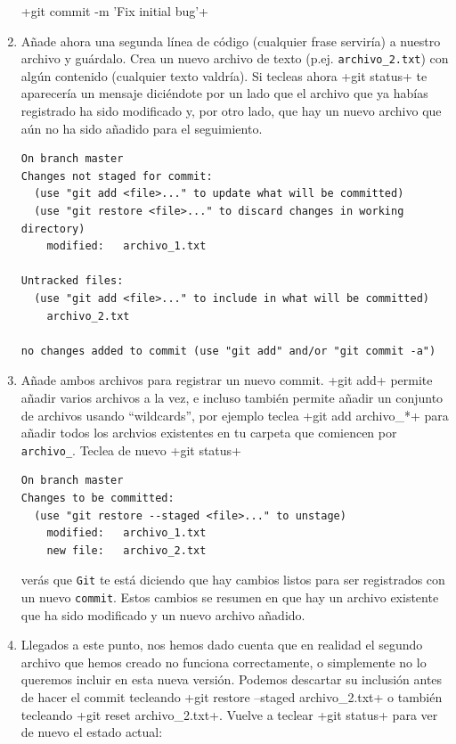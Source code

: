 \documentclass[a5paper,10pt]{article}
\begin{document}
\begin{enumerate}
    \cverb+git commit -m 'Fix initial bug'+
    
    \item Añade ahora una segunda línea de código (cualquier frase serviría) a nuestro archivo y guárdalo. Crea un nuevo archivo de texto (p.ej. \verb+archivo_2.txt+) con algún contenido (cualquier texto valdría). Si tecleas ahora \cverb+git status+ te aparecería un mensaje diciéndote por un lado que el archivo que ya habías registrado ha sido modificado y, por otro lado, que hay un nuevo archivo que aún no ha sido añadido para el seguimiento.
    
    \begin{lstlisting}[style=custom]
On branch master
Changes not staged for commit:
  (use "git add <file>..." to update what will be committed)
  (use "git restore <file>..." to discard changes in working directory)
	modified:   archivo_1.txt

Untracked files:
  (use "git add <file>..." to include in what will be committed)
	archivo_2.txt

no changes added to commit (use "git add" and/or "git commit -a")
    \end{lstlisting}
    
    \item Añade ambos archivos para registrar un nuevo commit.  \cverb+git add+ permite añadir varios archivos a la vez, e incluso también permite añadir un conjunto de archivos usando ``wildcards'', por ejemplo teclea \cverb+git add archivo_*+ para añadir todos los archvios existentes en tu carpeta que comiencen por \verb+archivo_+. Teclea de nuevo \cverb+git status+
    
    \begin{lstlisting}[style=custom]
On branch master
Changes to be committed:
  (use "git restore --staged <file>..." to unstage)
	modified:   archivo_1.txt
	new file:   archivo_2.txt
    \end{lstlisting}    
    verás que \verb+Git+ te está diciendo que hay cambios listos para ser registrados con un nuevo \verb+commit+. Estos cambios se resumen en que hay un archivo existente que ha sido modificado y un nuevo archivo añadido.
    
    \item Llegados a este punto, nos hemos dado cuenta que en realidad el segundo archivo que hemos creado no funciona correctamente, o simplemente no lo queremos incluir en esta nueva versión. Podemos descartar su inclusión antes de hacer el commit tecleando \cverb+git restore --staged archivo_2.txt+ o también tecleando \cverb+git reset archivo_2.txt+. Vuelve a teclear \cverb+git status+ para ver de nuevo el estado actual:
    

\end{enumerate}
\end{document}
